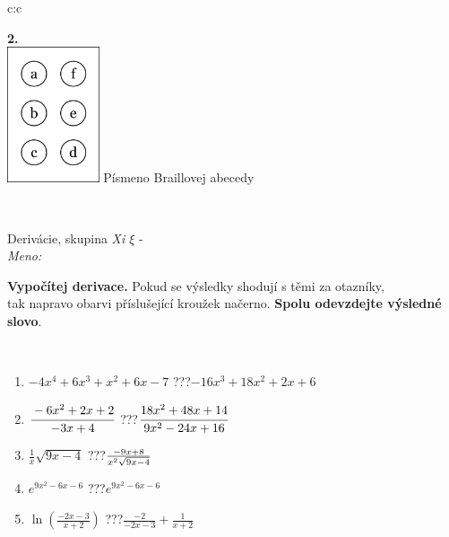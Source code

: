 \documentclass[10pt]{report}
\begin{document}
\begin{tabular}{c:c}
\begin{minipage}[c][104.5mm][t]{0.5\linewidth}
\begin{center}
\begin{minipage}{0.20\linewidth}
\begin{center}
{\Huge\bfseries 2.} \\[2mm]
\includegraphics[height=40mm]{../images/braille.png}
{\small Písmeno Braillovej abecedy}
\end{center}
\end{minipage}
\end{center}
\end{minipage}
\\ \hdashline
\begin{minipage}[c][104.5mm][t]{0.5\linewidth}
\begin{center}
\vspace{7mm}
{\huge Derivácie, skupina \textit{Xi $\xi$} -}\\[5mm]
\textit{Meno:}\phantom{xxxxxxxxxxxxxxxxxxxxxxxxxxxxxxxxxxxxxxxxxxxxxxxxxxxxxxxxxxxxxxxxx}\\[5mm]
\begin{minipage}{0.95\linewidth}
\begin{center}
\textbf{Vypočítej derivace.} Pokud se výsledky shodují s těmi za otazníky,\\tak napravo obarvi příslušející kroužek načerno. \textbf{Spolu odevzdejte výsledné slovo}.
\end{center}
\end{minipage}
\\[1mm]
\begin{minipage}{0.79\linewidth}
\begin{center}
\begin{varwidth}{\linewidth}
\begin{enumerate}
\normalsize
\item $-4x^4+6x^3+x^2+6x-7$\quad \dotfill\; ???\;\dotfill \quad $-16x^3+18x^2+2x+6$
\item $\cfrac{-6x^2+2x+2}{-3x+4}$\quad \dotfill\; ???\;\dotfill \quad $\cfrac{18x^2+48x+14}{9x^2-24x+16}$
\item $\frac{1}{x}\sqrt{9x-4}$\quad \dotfill\; ???\;\dotfill \quad $\frac{-9x+8}{x^2 \sqrt{\smash[b]{9x-4}}}$
\item $e^{9x^2-6x-6}$\quad \dotfill\; ???\;\dotfill \quad $e^{9x^2-6x-6}$
\item $\ln{\left(\frac{-2x-3}{x+2}\right)}$\quad \dotfill\; ???\;\dotfill \quad $\frac{-2}{-2x-3}+\frac{1}{x+2}$

\end{enumerate}
\end{varwidth}
\end{center}
\end{minipage}
\end{center}
\end{minipage}
\end{tabular}
\end{document}
